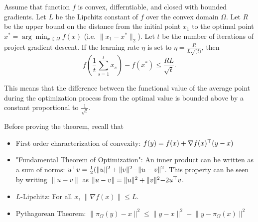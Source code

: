 \begin{theorem}

Assume that function $f$ is convex, differntiable, and closed with bounded
gradients. Let $L$ be the Lipchitz constant of $f$ over the convex domain
$\Omega$. Let $R$ be the upper bound on the distance from the initial point
$x_1$ to the optimal point $x^* = \arg\min_{x \in \Omega} f(x)$ (i.e. $\lVert
x_1 - x^* \rVert_2$). Let $t$ be the number of iterations of project gradient
descent. If the learning rate $\eta$ is set to $\eta=\frac{R}{L \sqrt(t)}$,
then $$f\left(\frac{1}{t}\sum_{s=1}^t x_s\right) - f\left(x^*\right) \leq
\frac{RL}{\sqrt{t}}.$$ \end{theorem}

This means that the difference between the functional value of the average
point during the optimization process from the optimal value is bounded above
by a constant proportional to $\frac{1}{\sqrt{t}}$. 

Before proving the theorem, recall that
\begin{itemize}

    \item First order characterization of convexity: $f(y) = f(x) + \nabla
    f(x)^\top (y - x)$

    \item "Fundamental Theorem of Optimization": An inner product can be
    written as a sum of norms: $u^\top v = \frac{1}{2}(\lVert u \rVert^2 +
    \lVert v \lVert^2 - \lVert u - v \rVert^2$. This property can be seen by
    writing $\lVert u - v \rVert$ as $\lVert u - v \rVert = \lVert u \rVert^2 +
    \lVert v \lVert^2 - 2 u^\top v$.
    
    \item $L$-Lipchitz: For all $x$, $\lVert \nabla f(x) \rVert \leq L$.
    
    \item Pythagorean Theorem: $\lVert \pi_\Omega (y) - x \rVert^2 \leq \lVert
    y - x \rVert^2 - \lVert y - \pi_\Omega (x) \rVert^2$

\end{itemize}

